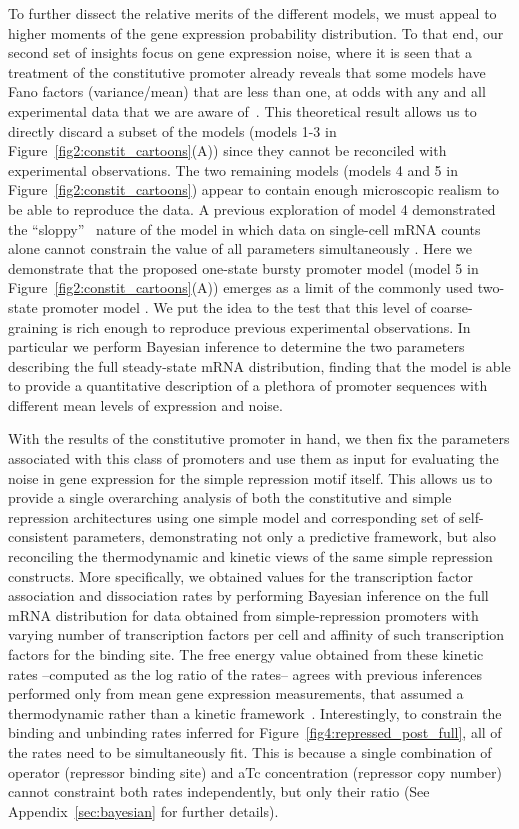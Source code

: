 To further dissect the relative merits of the different models, we must appeal
to higher moments of the gene expression probability distribution. To that end,
our second set of insights focus on gene expression noise, where it is seen that
a treatment of the constitutive promoter already reveals that some models have
Fano factors (variance/mean) that are less than one, at odds with any and all
experimental data that we are aware of~\cite{So2011, Jones2014}. This
theoretical result allows us to directly discard a subset of the models (models
1-3 in Figure~\ref{fig2:constit_cartoons}(A)) since they cannot be reconciled
with experimental observations. The two remaining models (models 4 and 5 in
Figure~\ref{fig2:constit_cartoons}) appear to contain enough microscopic realism
to be able to reproduce the data. A previous exploration of model 4 demonstrated
the ``sloppy''~\cite{Transtrum2015} nature of the model in which data on
single-cell mRNA counts alone cannot constrain the value of all parameters
simultaneously \cite{Razo-Mejia2020}. Here we demonstrate that the proposed
one-state bursty promoter model (model 5 in
Figure~\ref{fig2:constit_cartoons}(A)) emerges as a limit of the commonly used
two-state promoter model \cite{Peccoud1995, Shahrezaei2008, So2011, Sanchez2013,
Jones2014}. We put the idea to the test that this level of coarse-graining is
rich enough to reproduce previous experimental observations. In particular we
perform Bayesian inference to determine the two parameters describing the full
steady-state mRNA distribution, finding that the model is able to provide a
quantitative description of a plethora of promoter sequences with different mean
levels of expression and noise.

With the results of the constitutive promoter in hand, we then fix the
parameters associated with this class of promoters and use them as input for
evaluating the noise in gene expression for the simple repression motif itself.
This allows us to provide a single overarching analysis of both the constitutive
and simple repression architectures using one simple model and corresponding set
of self-consistent parameters, demonstrating not only a predictive framework,
but also reconciling the thermodynamic and kinetic views of the same simple
repression constructs. More specifically, we obtained values for the
transcription factor association and dissociation rates by performing Bayesian
inference on the full mRNA distribution for data obtained from simple-repression
promoters with varying number of transcription factors per cell and affinity of
such transcription factors for the binding site. The free energy value obtained
from these kinetic rates --computed as the log ratio of the rates-- agrees with
previous inferences performed only from mean gene expression measurements, that
assumed a thermodynamic rather than a kinetic
framework~\cite{Garcia2011a,Razo-Mejia2018}. Interestingly, to constrain the
binding and unbinding rates inferred for Figure~\ref{fig4:repressed_post_full},
all of the rates need to be simultaneously fit. This is because a single
combination of operator (repressor binding site) and aTc concentration
(repressor copy number) cannot constraint both rates independently, but only
their ratio (See Appendix~\ref{sec:bayesian} for further details).

